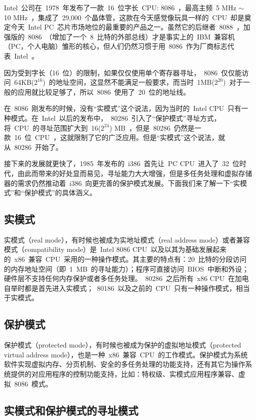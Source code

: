 Intel~公司在~1978~年发布了一款~16~位字长~CPU: 8086~，最高主频~5 MHz $\sim$ 10 MHz~，集成了~29,000~个晶体管，这款在今天感觉像玩具一样的~CPU~却是奠定今天~Intel PC~芯片市场地位的最重要的产品之一。虽然它的后继者~8088~，加强版的~8086~（增加了一个~8~比特的外部总线）才是事实上的~IBM~兼容机（PC，个人电脑）雏形的核心，但人们仍然习惯于用~8086~作为厂商标志代表~Intel~。

因为受到字长（16~位）的限制，如果仅仅使用单个寄存器寻址，~8086~仅仅能访问~64KB($2^{16}$)~的地址空间，这显然不能满足一般要求，而当时~1MB($2^{20}$)~对于一般的应用就比较足够了，所以~8086~使用了~20~位的地址线。

在~8086~刚发布的时候，没有“实模式”这个说法，因为当时的~Intel CPU~只有一种模式。在~Intel~以后的发布中，~80286~引入了“保护模式”寻址方式，将~CPU~的寻址范围扩大到~16($2^{24}$) MB~，但是~80286~仍然是一款~16~位~CPU~，这就限制了它的广泛应用。但是“实模式”这个说法，就从~80286~开始了。

接下来的发展就更快了，1985~年发布的~i386~首先让~PC CPU~进入了~32~位时代，由此而带来的好处显而易见，寻址能力大大增强，但是多任务处理和虚拟存储器的需求仍然推动着~i386~向更完善的保护模式发展。下面我们来了解一下“实模式”和“保护模式”的具体涵义。

\subsection{实模式}

实模式（real mode），有时候也被成为实地址模式（real address mode）或者兼容模式（compatibility mode）是~Intel 8086 CPU~以及以其为基础发展起来的~x86~兼容~CPU~采用的一种操作模式。其主要的特点有：20~比特的分段访问的内存地址空间（即~1~MB~的寻址能力）；程序可直接访问~BIOS~中断和外设；硬件层不支持任何内存保护或者多任务处理。~80286~之后所有~x86 CPU~在加电自举时都是首先进入实模式；~80186~以及之前的~CPU~只有一种操作模式，相当于实模式。

\subsection{保护模式}

保护模式（protected mode），有时候也被成为保护的虚拟地址模式（protected virtual address mode），也是一种~x86~兼容~CPU~的工作模式。保护模式为系统软件实现虚拟内存、分页机制、安全的多任务处理的功能支持，还有其它为操作系统提供的对应用程序的控制功能支持，比如：特权级、实模式应用程序兼容、虚拟~8086~模式。

\subsection{实模式和保护模式的寻址模式}

